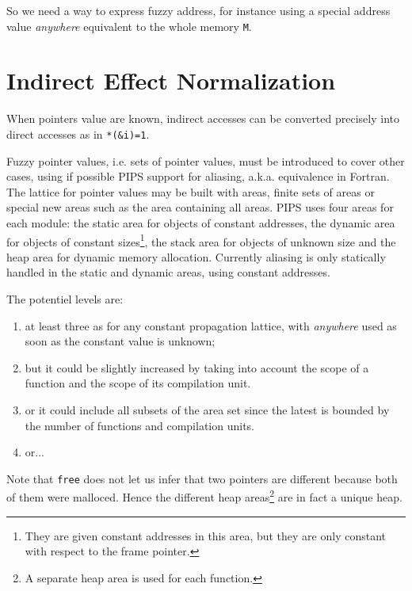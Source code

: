 \documentclass[a4paper]{report}
\begin{document}
So we need a way to express fuzzy address, for instance using a
 special address value {\em anywhere} equivalent to the whole memory
 \verb/M/.

\section{Indirect Effect Normalization}

When pointers value are known, indirect accesses can be converted
 precisely into direct accesses as in \verb/*(&i)=1/.

Fuzzy pointer values, i.e. sets of pointer values, must be introduced
 to cover other cases, using if possible PIPS support for aliasing,
 a.k.a. equivalence in Fortran. The lattice for pointer values may be
 built with areas, finite sets of areas or special new areas such as
 the area containing all areas. PIPS uses four areas for each module:
 the static area for objects of constant addresses, the dynamic area
 for objects of constant sizes\footnote{They are given constant
 addresses in this area, but they are only constant with respect to
 the frame pointer.}, the stack area for objects of unknown size and
 the heap area for dynamic memory allocation. Currently aliasing is
 only statically handled in the static and dynamic areas, using
 constant addresses.

The potentiel levels are:
\begin{enumerate}

\item at least three as for any constant propagation lattice, with
 {\em anywhere} used as soon as the constant value is unknown;

\item but it could be slightly increased by taking into account the
 scope of a function and the scope of its compilation unit.

\item or it could include all subsets of the area set since the latest
 is bounded by the number of functions and compilation units.

\item or...

\end{enumerate}

Note that \verb/free/ does not let us infer that two pointers are
 different because both of them were malloced. Hence the different
 heap areas\footnote{A separate heap area is used for each function.}
 are in fact a unique heap.
\end{document}
